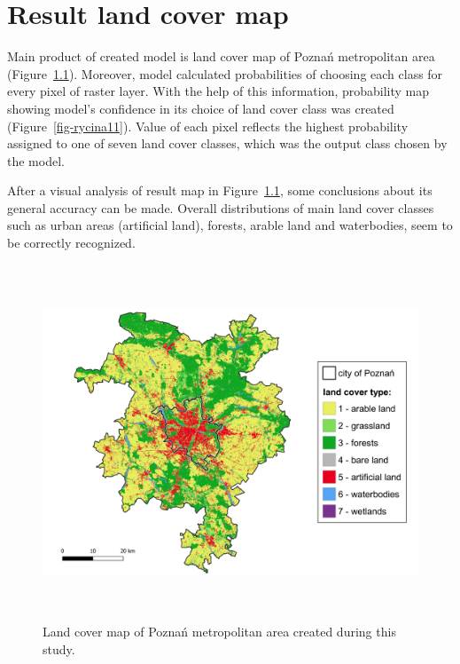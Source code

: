 \documentclass{amuthesis}
\begin{document}

\hypertarget{sec-results-map}{%
\chapter{Result land cover map}\label{sec-results-map}}

Main product of created model is land cover map of Poznań metropolitan
area (Figure~\ref{fig-rycina9}). Moreover, model calculated
probabilities of choosing each class for every pixel of raster layer.
With the help of this information, probability map showing model's
confidence in its choice of land cover class was created
(Figure~\ref{fig-rycina11}). Value of each pixel reflects the highest
probability assigned to one of seven land cover classes, which was the
output class chosen by the model.

After a visual analysis of result map in Figure~\ref{fig-rycina9}, some
conclusions about its general accuracy can be made. Overall
distributions of main land cover classes such as urban areas (artificial
land), forests, arable land and waterbodies, seem to be correctly
recognized.

\begin{figure}[t]

{\centering \includegraphics[width=5.875in,height=4.16667in]{./figures/result_map-lc.png}

}

\caption{\label{fig-rycina9}Land cover map of Poznań metropolitan area
created during this study.}

\end{figure}
\end{document}

